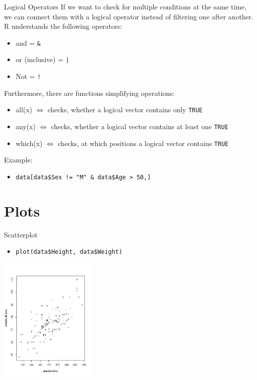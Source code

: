\documentclass[xcolor=dvipsnames, aspectratio = 169]{beamer}
\begin{document}
\begin{frame}[fragile]{Logical Operators}
If we want to check for multiple conditions at the same time, we can connect them with a logical operator instead of filtering one after another. R understands the following operators:\\
\begin{itemize}
			\item  and = \verb+&+
			\item  or (inclusive) = \verb+|+
			\item Not = \verb+!+
\end{itemize}
Furthermore, there are functions simplifying operations:\\
\begin{itemize}
			\item all(x) $\Leftrightarrow$ checks, whether a logical vector contains only \verb+TRUE+ 
			\item any(x) $\Leftrightarrow$ checks, whether a logical vector contains at least one \verb+TRUE+
			\item which(x) $\Leftrightarrow$ checks, at which positions a logical vector contains \verb+TRUE+
\end{itemize}
Example:
	\begin{itemize}
		\item  \verb+data[data$Sex != "M" & data$Age > 50,]+
	\end{itemize}
\end{frame}


\section{Plots}

\begin{frame}[fragile]{Scatterplot}
	\begin{itemize}
		\item \verb+plot(data$Height, data$Weight)+
	\end{itemize}
			
	\begin{center}
		\includegraphics[height=6cm]{Scatterplot}
	\end{center}
\end{frame}
\end{document}
